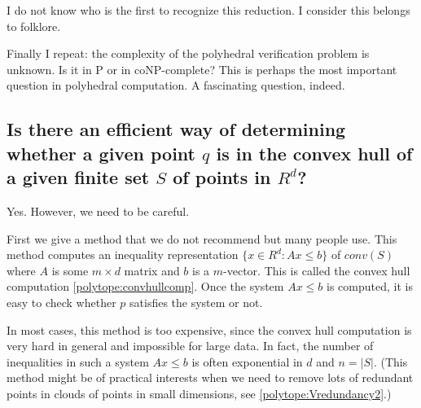 \documentclass[[a4paper,12pt]{article}
\begin{document}
I do not know who is the first to recognize this reduction.
I consider this belongs to folklore.

Finally I repeat:  the complexity of the polyhedral verification
problem is unknown.  Is it in P or in coNP-complete?  
This is perhaps the most important question in polyhedral
computation.
A fascinating question, indeed.



\subsection{Is there an 
efficient way of determining whether a given point $q$
is in the convex hull of a given finite set $S$ of points in $R^d$?}
\label{polytope:Vredundancy}

Yes.  However, we need to be careful. 

First we give a method that we do not recommend but many people use.
This method computes an inequality
representation $\{x\in R^d: A x \le b \}$ of $conv(S)$ where
$A$ is some $m \times d$ matrix and $b$ is a $m$-vector.  
This is called the convex hull computation
\ref{polytope:convhullcomp}.  Once the system $A x \le b$ is
computed, it is easy to check whether $p$ satisfies the system
or not.

In most cases, this method is too expensive, since the convex
hull computation is very hard in general and impossible for
large data.  In fact,
 the number of inequalities in such a system $A x \le b$ 
is often exponential in $d$ and $n=|S|$.
(This method might be of practical interests when we need to
remove lots of redundant points in clouds of points in small dimensions, 
see \ref{polytope:Vredundancy2}.)
\end{document}
